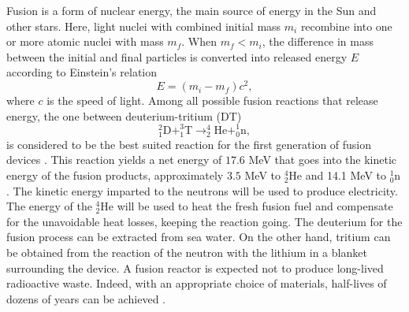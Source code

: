 Fusion is a form of nuclear energy, the main source of energy in the Sun and other stars.
%
Here, light nuclei with combined initial mass $m_i$ recombine into one or more atomic nuclei with mass $m_f$.
%
When $m_f<m_i$, the difference in mass between the initial and final particles is converted into released energy $E$ according to Einstein's relation
%
\begin{equation}
E = (m_i - m_f)c^2,
\label{eq:einstein}
\end{equation}
%
\noindent where $c$ is the speed of light.
%
Among all possible fusion reactions that release energy, the one between deuterium-tritium (DT)
%
\begin{equation}
    ^2_1 \text{D} + ^3_1 \text{T} \rightarrow ^4_2 \text{He}+^1_0\text{n},
\label{eq:dt}
\end{equation}
%
is considered to be the best suited reaction for the first generation of fusion devices \citep{Freidberg2007}.
%
This reaction yields a net energy of $17.6$ MeV that goes into the kinetic energy of the fusion products, approximately $3.5$ MeV to $^4_2 \text{He}$ and 14.1 MeV to $^1_0\text{n}$.
%
The kinetic energy imparted to the neutrons will be used to produce electricity.
%
The energy of the $^4_2 \text{He}$ will be used to heat the fresh fusion fuel and compensate for the unavoidable heat losses, keeping the reaction going.
%
The deuterium for the fusion process can be extracted from sea water.
%
On the other hand, tritium can be obtained from the reaction of the neutron with the lithium in a blanket surrounding the device.
%
A fusion reactor is expected not to produce long-lived radioactive waste.
%
Indeed, with an appropriate choice of materials, half-lives of dozens of years can be achieved \citep{Fetter1988}.

